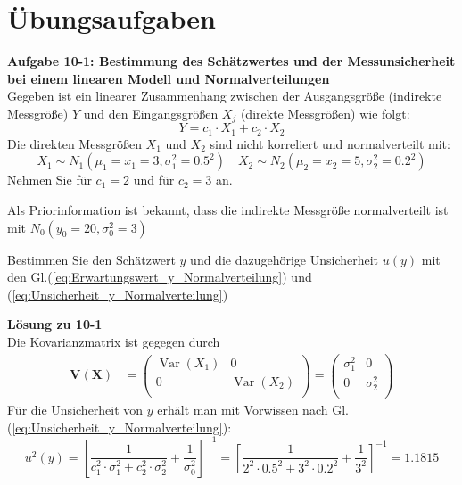 \newpage
\section{Übungsaufgaben}
\textbf{Aufgabe 10-1: Bestimmung des Schätzwertes und der Messunsicherheit bei
einem linearen Modell und Normalverteilungen}\\
Gegeben ist ein linearer Zusammenhang zwischen der Ausgangsgröße (indirekte
Messgröße) $Y$ und den Eingangsgrößen $X_j$ (direkte Messgrößen) wie folgt:
\[
Y = c_1 \cdot X_1 + c_2 \cdot X_2
\]
Die direkten Messgrößen $X_1$ und $X_2$ sind nicht korreliert und
normalverteilt mit:
\[
X_1 \sim N_{1}(\mu_1 =x_1=3,\sigma_1^2= 0.5^2 )
\quad X_2 \sim N_{2}(\mu_2=x_2= 5,\sigma_2^2=0.2^2 )
\]
Nehmen Sie für $c_1 = 2$ und für $c_2 = 3$ an.

Als Priorinformation ist bekannt, dass die indirekte Messgröße
normalverteilt ist mit \newline  $N_0(y_0=20,\sigma_0^2=3)$

Bestimmen Sie den Schätzwert $y$ und die dazugehörige Unsicherheit
$u(y)$ mit den Gl.(\ref{eq:Erwartungswert_y_Normalverteilung}) und
(\ref{eq:Unsicherheit_y_Normalverteilung})

\textbf{Lösung zu 10-1} \\
Die Kovarianzmatrix ist gegegen durch
\begin{align}
\boldsymbol{V(X)} &=
\begin{pmatrix}
\operatorname{Var}(X_1) & 0 \\
0 & \operatorname{Var}(X_2)  \\
\end{pmatrix}
=
\begin{pmatrix}
\sigma_1^2 & 0 \\
0 & \sigma_2^2 \\
\end{pmatrix}
\end{align}
Für die Unsicherheit von $y$ erhält man mit Vorwissen nach Gl.	(\ref{eq:Unsicherheit_y_Normalverteilung}):
\[
u^2(y) = \left[ \frac{1}{c_1^2\cdot \sigma_1^2 + c_2^2\cdot \sigma_2^2}
+ \frac{1}{\sigma_0^2} \right]^{-1}
 = \left[ \frac{1}{2^2\cdot 0.5^2 + 3^2\cdot 0.2^2}
+ \frac{1}{3^2} \right]^{-1} = 1.1815
\]

